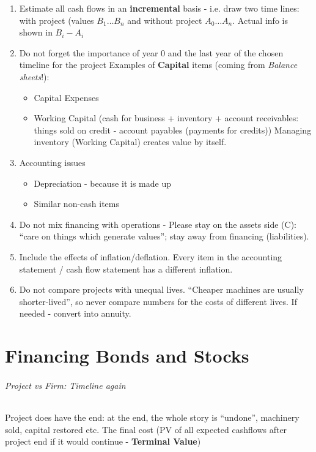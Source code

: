 \documentclass{scrartcl}
\begin{document}
\begin{enumerate}
\item Estimate all cash flows in an {\bf incremental} basis - i.e. draw two time
  lines: with project (values $B_1 \dots B_n$ and without project $A_0 \dots
  A_n$. Actual info is shown in $B_i - A_i$
\item Do not forget the importance of year 0 and the last year of the chosen
  timeline for the project Examples of {\bf Capital} items (coming from {\it
    Balance sheets}\;!):
  \begin{itemize}
  \item Capital Expenses
  \item Working Capital (cash for business + inventory + account receivables:
    things sold on credit - account payables (payments for credits)) Managing
    inventory (Working Capital) creates value by itself.
  \end{itemize}
\item Accounting issues
  \begin{itemize}
  \item Depreciation - because it is made up
  \item Similar non-cash items
  \end{itemize}
\item Do not mix financing with operations - Please stay on the assets side (C):
  ``care on things which generate values''; stay away from financing
  (liabilities).

\item Include the effects of inflation/deflation. Every item in the accounting
  statement / cash flow statement has a different inflation.
\item Do not compare projects with unequal lives. ``Cheaper machines are usually
  shorter-lived'', so never compare numbers for the costs of different lives. If
  needed - convert into annuity.
\end{enumerate}

\part{Financing Bonds and Stocks}
\label{part:BondsAndStocks}

\paragraph{Project vs Firm: Timeline again}

Project does have the end: at the end, the whole story is ``undone'', machinery
sold, capital restored etc. The final cost (PV of all expected cashflows after
project end if it would continue - {\bf Terminal Value})
\end{document}
